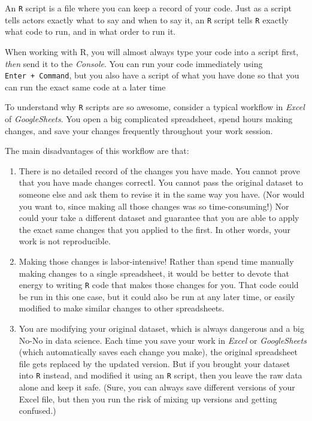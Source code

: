 \documentclass[
]{book}
\begin{document}
An \texttt{R} script is a file where you can keep a record of your code. Just as a script tells actors exactly what to say and when to say it, an \texttt{R} script tells \texttt{R} exactly what code to run, and in what order to run it.

When working with R, you will almost always type your code into a script first, \emph{then} send it to the \emph{Console}. You can run your code immediately using \texttt{Enter\ +\ Command}, but you also have a script of what you have done so that you can run the exact same code at a later time

To understand why \texttt{R} scripts are so awesome, consider a typical workflow in \emph{Excel} of \emph{GoogleSheets}. You open a big complicated spreadsheet, spend hours making changes, and save your changes frequently throughout your work session.

The main disadvantages of this workflow are that:

\begin{enumerate}
\def\labelenumi{\arabic{enumi}.}
\item
  There is no detailed record of the changes you have made. You cannot prove that you have made changes correctl. You cannot pass the original dataset to someone else and ask them to revise it in the same way you have. (Nor would you want to, since making all those changes was so time-consuming!) Nor could your take a different dataset and guarantee that you are able to apply the exact same changes that you applied to the first. In other words, your work is not reproducible.
\item
  Making those changes is labor-intensive! Rather than spend time manually making changes to a single spreadsheet, it would be better to devote that energy to writing \texttt{R} code that makes those changes for you. That code could be run in this one case, but it could also be run at any later time, or easily modified to make similar changes to other spreadsheets.
\item
  You are modifying your original dataset, which is always dangerous and a big No-No in data science. Each time you save your work in \emph{Excel} or \emph{GoogleSheets} (which automatically saves each change you make), the original spreadsheet file gets replaced by the updated version. But if you brought your dataset into \texttt{R} instead, and modified it using an \texttt{R} script, then you leave the raw data alone and keep it safe. (Sure, you can always save different versions of your Excel file, but then you run the risk of mixing up versions and getting confused.)
\end{enumerate}
\end{document}
